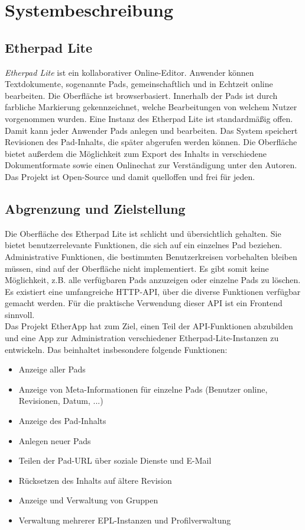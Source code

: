\section{Systembeschreibung} %
\label{sec:system}

\subsection{Etherpad Lite}
\label{sub:system:etherpad}

\textit{Etherpad Lite} ist ein kollaborativer Online-Editor. Anwender können Textdokumente, sogenannte Pads, gemeinschaftlich und in Echtzeit online bearbeiten. Die Oberfläche ist browserbasiert. Innerhalb der Pads ist durch farbliche Markierung gekennzeichnet, welche Bearbeitungen von welchem Nutzer vorgenommen wurden. Eine Instanz des Etherpad Lite ist standardmäßig offen. Damit kann jeder Anwender Pads anlegen und bearbeiten. Das System speichert Revisionen des Pad-Inhalts, die später abgerufen werden können. Die Oberfläche bietet außerdem die Möglichkeit zum Export des Inhalts in verschiedene Dokumentformate sowie einen Onlinechat zur Verständigung unter den Autoren.\\
Das Projekt ist Open-Source und damit quelloffen und frei für jeden.

\subsection{Abgrenzung und Zielstellung}
Die Oberfläche des Etherpad Lite ist schlicht und übersichtlich gehalten. Sie bietet benutzerrelevante Funktionen, die sich auf ein einzelnes Pad beziehen. Administrative Funktionen, die bestimmten Benutzerkreisen vorbehalten bleiben müssen, sind auf der Oberfläche nicht implementiert. Es gibt somit keine Möglichkeit, z.B. alle verfügbaren Pads anzuzeigen oder einzelne Pads zu löschen.\\
Es existiert eine umfangreiche HTTP-API, über die diverse Funktionen verfügbar gemacht werden. Für die praktische Verwendung dieser API ist ein Frontend sinnvoll.\\
Das Projekt EtherApp hat zum Ziel, einen Teil der API-Funktionen abzubilden und eine App zur Administration verschiedener Etherpad-Lite-Instanzen zu entwickeln. Das beinhaltet insbesondere folgende Funktionen:
\begin{itemize}
	\item Anzeige aller Pads
	\item Anzeige von Meta-Informationen für einzelne Pads (Benutzer online, Revisionen, Datum, ...)
	\item Anzeige des Pad-Inhalts
	\item Anlegen neuer Pads
	\item Teilen der Pad-URL über soziale Dienste und E-Mail
	\item Rücksetzen des Inhalts auf ältere Revision
	\item Anzeige und Verwaltung von Gruppen
	\item Verwaltung mehrerer EPL-Instanzen und Profilverwaltung
\end{itemize}



